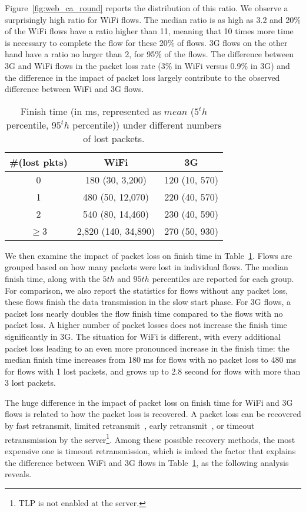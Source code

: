 Figure~\ref{fig:web_ca_round} reports the distribution of this ratio. We observe a surprisingly high ratio for WiFi flows. The median ratio is as high as 3.2 and 20\% of the WiFi flows have a ratio higher than 11, meaning that 10 times more time is necessary to complete the flow for these 20\% of flows. 3G flows on the other hand have a ratio no larger than 2, for 95\% of the flows. The difference between 3G and WiFi flows in the packet loss rate (3\% in WiFi versus 0.9\% in 3G) and the difference in the impact of packet loss largely contribute to the observed difference between WiFi and 3G flows.

\begin{table}[th]
\caption{Finish time (in ms, represented as $mean$ ($5^th$ percentile, $95^th$ percentile)) under different numbers of lost packets.}
\label{tab:web_loss_finish_time}
\centering
\renewcommand{\arraystretch}{1.0}
\begin{tabular}{c|c|c}
\hline
\#(lost pkts) & WiFi & 3G\\
\hline
0 & 180 (30, 3,200) & 120 (10, 570) \\
%
1 & 480 (50, 12,070) & 220 (40, 570) \\
%
2 & 540 (80, 14,460) & 230 (40, 590) \\
%
$\ge$3 & 2,820 (140, 34,890) & 270 (50, 930) \\
\hline
\end{tabular}
\end{table}

We then examine the impact of packet loss on finish time in Table~\ref{tab:web_loss_finish_time}. Flows are grouped based on how many packets were lost in individual flows. The median finish time, along with the $5th$ and $95th$ percentiles are reported for each group. For comparison, we also report the statistics for flows without any packet loss, \ie these flows finish the data transmission in the slow start phase. For 3G flows, a packet loss nearly doubles the flow finish time compared to the flows with no packet loss. A higher number of packet losses does not increase the finish time significantly in 3G. The situation for WiFi is different, with every additional packet loss leading to an even more pronounced increase in the finish time: the median finish time increases from 180 ms for flows with no packet loss to 480 ms for flows with 1 lost packets, and grows up to 2.8 second for flows with more than 3 lost packets. 

The huge difference in the impact of packet loss on finish time for WiFi and 3G flows is related to how the packet loss is recovered. A packet loss can be recovered by fast retransmit, limited retransmit~\cite{allman2001enhancing}, early retransmit~\cite{rfc5827}, or timeout retransmission by the server\footnote{TLP \cite{flach2013reducing} is not enabled at the server.}. Among these possible recovery methods, the most expensive one is timeout retransmission, which is indeed the factor that explains the difference between WiFi and 3G flows in Table~\ref{tab:web_loss_finish_time}, as the following analysis reveals.

